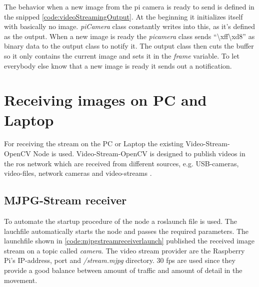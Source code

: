 The behavior when a new image from the pi camera is ready to send is defined in the snipped \ref{code:videoStreamingOutput}. At the beginning it initializes itself with basically no image. \textit{piCamera} class constantly writes into this, as it's defined as the output. When a new image is ready the \textit{picamera} class sends \enquote{\textbackslash xff\textbackslash xd8} as binary data to the output class to notify it. The output class then cuts the buffer so it only contains the current image and sets it in the \textit{frame} variable. To let everybody else know that a new image is ready it sends out a notification.\newline



\section{Receiving images on PC and Laptop\authorA}
For receiving the stream on the PC or Laptop the existing Video-Stream-OpenCV Node is used. Video-Stream-OpenCV is designed to publish videos in the \gls{ros} network which are received from different sources, e.g. USB-cameras, video-files, network cameras and video-streams \cite{videostreamopencv}.

\subsection{MJPG-Stream receiver}
To automate the startup procedure of the node a roslaunch file is used. The lauchfile automatically starts the node and passes the required parameters.\newline
The launchfile shown in \ref{code:mjpgstreamreceiverlaunch} published the received image stream on a topic called \textit{camera}. The video stream provider are the Raspberry Pi's IP-address, port and \textit{/stream.mjpg} directory. 30 \gls{fps} are used since they provide a good balance between amount of traffic and amount of detail in the movement.\newline




